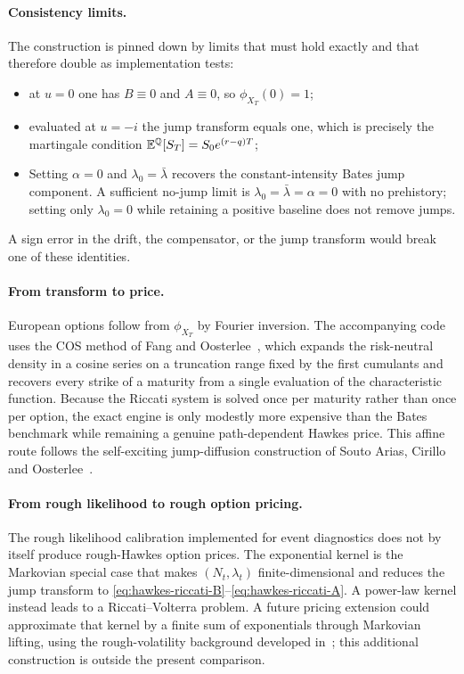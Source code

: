 \paragraph{Consistency limits.}
The construction is pinned down by limits that must hold exactly and that therefore double as implementation tests:
\begin{itemize}[leftmargin=8mm, itemsep=2pt]
    \item at \(u=0\) one has \(B\equiv0\) and \(A\equiv0\), so \(\phi_{X_T}(0)=1\);
    \item evaluated at \(u=-i\) the jump transform equals one, which is precisely the martingale condition \(\mathbb{E}^{\mathbb{Q}}[S_T]=S_0e^{(r-q)T}\);
\item Setting $\alpha=0$ and $\lambda_0=\bar\lambda$ recovers the
constant-intensity Bates jump component. A sufficient no-jump limit
is $\lambda_0=\bar\lambda=\alpha=0$ with no prehistory; setting only
$\lambda_0=0$ while retaining a positive baseline does not remove jumps.
\end{itemize}
A sign error in the drift, the compensator, or the jump transform would break one of these identities.

\paragraph{From transform to price.}
European options follow from \(\phi_{X_T}\) by Fourier inversion. The accompanying code uses the COS method of Fang and Oosterlee~\cite{FangOosterlee2008}, which expands the risk-neutral density in a cosine series on a truncation range fixed by the first cumulants and recovers every strike of a maturity from a single evaluation of the characteristic function. Because the Riccati system is solved once per maturity rather than once per option, the exact engine is only modestly more expensive than the Bates benchmark while remaining a genuine path-dependent Hawkes price. This affine route follows the self-exciting jump-diffusion construction of Souto Arias, Cirillo and Oosterlee~\cite{SoutoArias2023}.

\paragraph{From rough likelihood to rough option pricing.}
The rough likelihood calibration implemented for event diagnostics does not by itself produce rough-Hawkes option prices. The exponential kernel is the Markovian special case that makes \((N_t,\lambda_t)\) finite-dimensional and reduces the jump transform to \eqref{eq:hawkes-riccati-B}--\eqref{eq:hawkes-riccati-A}. A power-law kernel instead leads to a Riccati--Volterra problem. A future pricing extension could approximate that kernel by a finite sum of exponentials through Markovian lifting, using the rough-volatility background developed in~\cite{MessinaSoriano2026}; this additional construction is outside the present comparison.


